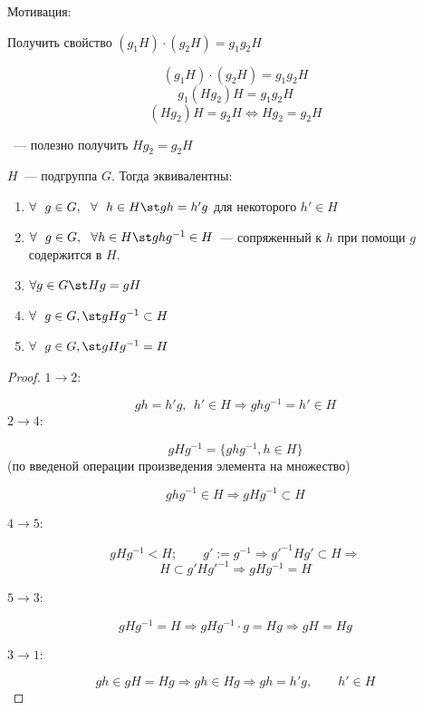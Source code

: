 Мотивация:

Получить свойство $(g_1H)\cdot (g_2H) = g_1g_2H$

\[ (g_1H)\cdot (g_2H) = g_1g_2H \]
\[ g_1(Hg_2)H = g_1g_2H \]
\[ (Hg_2)H = g_2H \Leftrightarrow Hg_2 = g_2H \]

~--- полезно получить $Hg_2 = g_2H$

\begin{Proposition}{}{}

    $H$~--- подгруппа $G$. Тогда эквивалентны:

    \begin{enumerate}
        \item $\forall \ \ g \in G, \ \ \forall \ \ h \in H \st gh = h'g$ для некоторого $h' \in H$
        \item $\forall \ \ g \in G, \ \ \forall h \in  H \st ghg^{-1} \in H$~--- сопряженный к $h$ при помощи $g$ содержится в $H$.
        \item $\forall g \in G \st Hg = gH$
        \item $\forall \ \ g \in G, \st gHg^{-1} \subset H$
        \item $\forall \ \ g \in G, \st gHg^{-1} = H$
    \end{enumerate}
\end{Proposition}

\begin{proof}
    
    $1 \rightarrow 2$:

    \[ gh = h'g, \ \ h' \in H \Rightarrow ghg^{-1} = h' \in H \]
    $2 \rightarrow 4$:

    \[ gHg^{-1} = \{ ghg^{-1}, h \in H \} \] (по введеной операции произведения элемента на множество)

    \[ ghg^{-1} \in H \Rightarrow gHg^{-1} \subset H \]

    $4 \rightarrow 5$:

    \[ gHg^{-1} < H; \qquad g' := g^{-1} \Rightarrow g'^{-1}Hg' \subset H \Rightarrow \]
    \[ H \subset g'Hg'^{-1} \Rightarrow gHg^{-1} = H \]

    $5 \rightarrow 3$:

    \[ gHg^{-1} = H \Rightarrow gHg^{-1}\cdot g = Hg \Rightarrow gH = Hg \]

    $3 \rightarrow 1$:

    \[ gh \in gH = Hg \Rightarrow gh \in Hg \Rightarrow gh = h'g, \qquad h' \in H \]

\end{proof}

